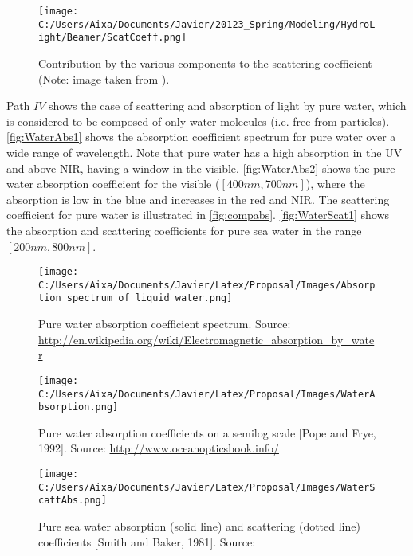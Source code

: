 \begin{figure}[htb]
\centering
      \texttt{[image: C:/Users/Aixa/Documents/Javier/20123\_Spring/Modeling/HydroLight/Beamer/ScatCoeff.png]}
      \caption{Contribution by the various components to the scattering coefficient (Note: image taken from \cite{Mobley:2001}).}
      \label{fig:compscat}
\end{figure}

Path $IV$ shows the case of scattering and absorption of light by pure water, which is considered to be composed of only water molecules (i.e. free from particles). \autoref{fig:WaterAbs1} shows the absorption coefficient spectrum for pure water over a wide range of wavelength. Note that pure water has a high absorption in the UV and above NIR, having a window in the visible. \autoref{fig:WaterAbs2} shows the pure water absorption coefficient for the visible ($[400nm,700nm]$), where the absorption is low in the blue and increases in the red and NIR. The scattering coefficient for pure water is illustrated in \autoref{fig:compabs}. \autoref{fig:WaterScat1} shows the absorption and scattering coefficients for pure sea water in the range $[200nm,800nm]$.

\begin{figure}[!ht]
  \centering
      \texttt{[image: C:/Users/Aixa/Documents/Javier/Latex/Proposal/Images/Absorption\_spectrum\_of\_liquid\_water.png]}
  \caption{Pure water absorption coefficient spectrum. Source: \protect\url{http://en.wikipedia.org/wiki/Electromagnetic_absorption_by_water}}
  \label{fig:WaterAbs1}
\end{figure}

\begin{figure}[!ht]
  \centering
      \texttt{[image: C:/Users/Aixa/Documents/Javier/Latex/Proposal/Images/WaterAbsorption.png]}
  \caption{Pure water absorption coefficients on a semilog scale [Pope and Frye, 1992].  Source: \protect\url{http://www.oceanopticsbook.info/}}
  \label{fig:WaterAbs2}
\end{figure}

\begin{figure}[!ht]
  \centering
      \texttt{[image: C:/Users/Aixa/Documents/Javier/Latex/Proposal/Images/WaterScattAbs.png]}
  \caption{Pure sea water absorption (solid line)  and scattering (dotted line) coefficients [Smith and Baker, 1981]. Source: \cite{Mobley1994}}
  \label{fig:WaterScat1}
\end{figure}

